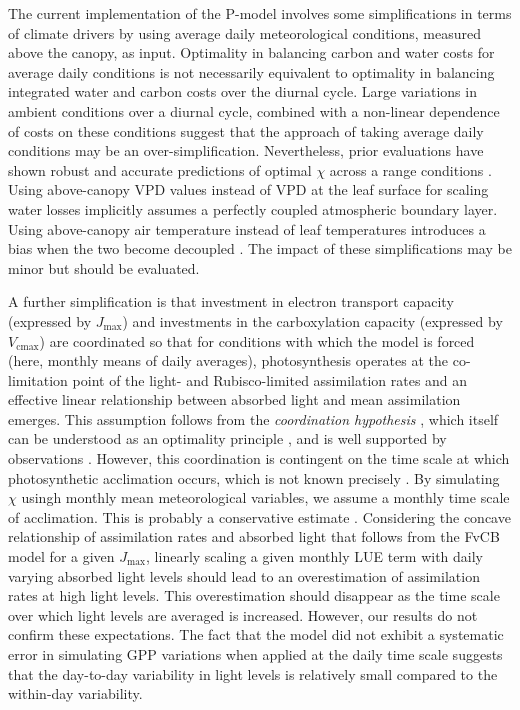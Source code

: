 \documentclass[gmd, manuscript]{copernicus}
\newcommand{\vcmax}{$V_{\text{cmax}}$}
\newcommand{\jmax}{$J_{\text{max}}$}
\begin{document}
The current implementation of the P-model involves some simplifications in terms of climate drivers by using average daily meteorological conditions, measured above the canopy, as input. Optimality in balancing carbon and water costs for average daily conditions is not necessarily equivalent to optimality in balancing integrated water and carbon costs over the diurnal cycle. Large variations in ambient conditions over a diurnal cycle, combined with a non-linear dependence of costs on these conditions suggest that the approach of taking average daily conditions may be an over-simplification. Nevertheless, prior evaluations have shown robust and accurate predictions of optimal $\chi$ across a range conditions \citep{wang17natpl}. Using above-canopy VPD values instead of VPD at the leaf surface for scaling water losses implicitly assumes a perfectly coupled atmospheric boundary layer. Using above-canopy air temperature instead of leaf temperatures introduces a bias when the two become decoupled \citep{michaletz15tee}. The impact of these simplifications may be minor but should be evaluated. %

A further simplification is that investment in electron transport capacity (expressed by \jmax ) and investments in the carboxylation capacity (expressed by \vcmax ) are coordinated so that for conditions with which the model is forced (here, monthly means of daily averages), photosynthesis operates at the co-limitation point of the light- and Rubisco-limited assimilation rates and an effective linear relationship between absorbed light and mean assimilation emerges. This assumption follows from the \textit{coordination hypothesis} \citep{chen93, haxeltine96}, which itself can be understood as an optimality principle \citep{haxeltine96}, and is well supported by observations \citep{maire12po}. However, this coordination is contingent on the time scale at which photosynthetic acclimation occurs, which is not known precisely  \citep{smithdukes13gcb, way14}. By simulating $\chi$ usingh monthly mean meteorological variables, we assume a monthly time scale of acclimation. This is probably a conservative estimate \citep{smithdukes17, veres84}. Considering the concave relationship of assimilation rates and absorbed light that follows from the FvCB model for a given \jmax , linearly scaling a given monthly LUE term with daily varying absorbed light levels should lead to an overestimation of assimilation rates at high light levels. This overestimation should disappear as the time scale over which light levels are averaged is increased. However, our results do not confirm these expectations. The fact that the model did not exhibit a systematic error in simulating GPP variations when applied at the daily time scale suggests that the day-to-day variability in light levels is relatively small compared to the within-day variability.
\end{document}
